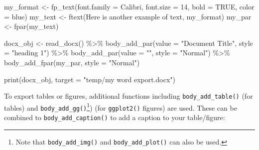 \documentclass[
]{book}
\newenvironment{Shaded}{\begin{snugshade}}{\end{snugshade}}
\newcommand{\AttributeTok}[1]{\textcolor[rgb]{0.77,0.63,0.00}{#1}}
\newcommand{\ConstantTok}[1]{\textcolor[rgb]{0.00,0.00,0.00}{#1}}
\newcommand{\DecValTok}[1]{\textcolor[rgb]{0.00,0.00,0.81}{#1}}
\newcommand{\FunctionTok}[1]{\textcolor[rgb]{0.00,0.00,0.00}{#1}}
\newcommand{\NormalTok}[1]{#1}
\newcommand{\OtherTok}[1]{\textcolor[rgb]{0.56,0.35,0.01}{#1}}
\newcommand{\SpecialCharTok}[1]{\textcolor[rgb]{0.00,0.00,0.00}{#1}}
\newcommand{\StringTok}[1]{\textcolor[rgb]{0.31,0.60,0.02}{#1}}
\begin{document}
\begin{Shaded}
\begin{Highlighting}[]
\NormalTok{my\_format }\OtherTok{\textless{}{-}} \FunctionTok{fp\_text}\NormalTok{(}\AttributeTok{font.family =} \StringTok{\textquotesingle{}Calibri\textquotesingle{}}\NormalTok{, }\AttributeTok{font.size =} \DecValTok{14}\NormalTok{, }\AttributeTok{bold =} \ConstantTok{TRUE}\NormalTok{, }\AttributeTok{color =} \StringTok{\textquotesingle{}blue\textquotesingle{}}\NormalTok{)}
\NormalTok{my\_text }\OtherTok{\textless{}{-}} \FunctionTok{ftext}\NormalTok{(}\StringTok{\textquotesingle{}Here is another example of text\textquotesingle{}}\NormalTok{, my\_format)}
\NormalTok{my\_par }\OtherTok{\textless{}{-}} \FunctionTok{fpar}\NormalTok{(my\_text)}

\NormalTok{docx\_obj }\OtherTok{\textless{}{-}} \FunctionTok{read\_docx}\NormalTok{() }\SpecialCharTok{\%\textgreater{}\%} 
  \FunctionTok{body\_add\_par}\NormalTok{(}\AttributeTok{value =} \StringTok{"Document Title"}\NormalTok{, }\AttributeTok{style =} \StringTok{"heading 1"}\NormalTok{) }\SpecialCharTok{\%\textgreater{}\%} 
  \FunctionTok{body\_add\_par}\NormalTok{(}\AttributeTok{value =} \StringTok{""}\NormalTok{, }\AttributeTok{style =} \StringTok{"Normal"}\NormalTok{) }\SpecialCharTok{\%\textgreater{}\%} 
  \FunctionTok{body\_add\_fpar}\NormalTok{(my\_par, }\AttributeTok{style =} \StringTok{"Normal"}\NormalTok{)}

\FunctionTok{print}\NormalTok{(docx\_obj, }\AttributeTok{target =} \StringTok{"temp/my word export.docx"}\NormalTok{)}
\end{Highlighting}
\end{Shaded}

To export tables or figures, additional functions including \texttt{body\_add\_table()} (for tables) and \texttt{body\_add\_gg()}\footnote{Note that \texttt{body\_add\_img()} and \texttt{body\_add\_plot()} can also be used.}) (for \texttt{ggplot2()} figures) are used. These can be combined to \texttt{body\_add\_caption()} to add a caption to your table/figure:
\end{document}
